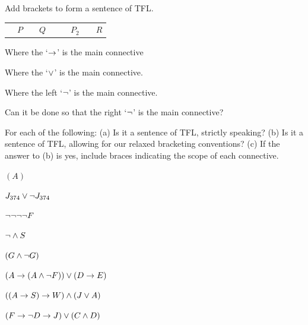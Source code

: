\begin{practiceproblems}
	
	\solutions
	
	\problempart 
	Add brackets to form a sentence of TFL.
	\begin{center}
		\begin{tabular}{>{\centering}p{.5em}>{\centering}p{.5em}>{\centering}p{.5em}>{\centering}p{.5em}>{\centering}p{.5em}>{\centering}p{.5em}>{\centering}p{.5em}>{\centering}p{.5em}>{\centering}p{.5em}}
			\enot &$P$&\eor &$Q$&\eif &\enot &$P_2$&\eand &$R$
		\end{tabular}
	\end{center}
	
	\begin{problemslist}
		\item Where the `$\rightarrow$' is the main connective
		\item Where the `$\vee$' is the main connective.
		\item Where the left `$\neg$' is the main connective. 
		\item Can it be done so that the right `$\neg$' is the main connective?
	\end{problemslist}
	
	
	\problempart
	\label{pr:wiffTFL}
	For each of the following: (a) Is it a sentence of TFL, strictly speaking? (b) Is it a sentence of TFL, allowing for our relaxed bracketing conventions? (c) If the answer to (b) is yes, include braces indicating the scope of each connective.
	\begin{problemslist}
		\item $(A)$\hfill {}
		\item $J_{374} \vee \neg J_{374}$\hfill {}
		\item $\neg \neg \neg \neg F$\hfill {}
		\item $\neg \mathbin{\wedge} S$\hfill {}
		\item $(G \mathbin{\wedge} \neg G)$\hfill {}
		\item $(A \rightarrow (A \mathbin{\wedge} \neg F)) \vee (D \rightarrow E)$\hfill {}
		\item $((A \rightarrow S) \rightarrow W) \mathbin{\wedge} (J \vee A)$\hfill {}
		\item $(F \rightarrow \neg D \rightarrow J) \vee (C \mathbin{\wedge} D)$\hfill {}
	\end{problemslist}
	

\end{practiceproblems}
